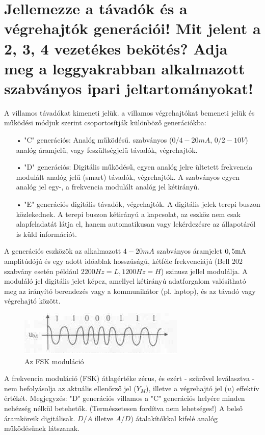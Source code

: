 \documentclass[11pt,a4paper]{article}
\begin{document}
\section{Jellemezze a távadók és a végrehajtók generációi! Mit jelent a 2, 3, 4 vezetékes bekötés? Adja meg a leggyakrabban alkalmazott szabványos ipari jeltartományokat!}
A villamos távadókat kimeneti jelük. a villamos végrehajtókat bemeneti jelük és működési módjuk szerint csoportosítják különböző generációkba:
\begin{enumerate}
	\item[•]"C" generációs: Analóg működésű. szabványos ($0/4-20mA$, $0/2-10V$) analóg áramjelű, vagy feszültségjelű távadók, végrehajtók.
	\item[•]"D" generációs: Digitális működésű, egyen analóg jelre ültetett frekvencia modulált analóg jelű (smart) távadók, végrehajtók. A szabványos egyen analóg jel egy-, a frekvencia modulált analóg jel kétirányú.
	\item[•]"E" generációs digitális távadók, végrehajtók. A digitális jelek terepi buszon közlekednek. A terepi buszon kétirányú a kapcsolat, az eszköz nem csak alapfeladatát látja el, hanem automatikusan vagy lekérdezésre az állapotáról is küld információt.
\end{enumerate}
A generációs eszközök az alkalmazott $4-20 mA$ szabványos áramjelet $\rm 0,5mA$ amplitúdójú és egy adott időablak hosszúságú, kétféle frekvenciájú (Bell 202 szabvány esetén például $2200 Hz = L, 1200 Hz = H$) szinusz jellel modulálja. A moduláló jel digitális jelet képez, amellyel kétirányú adatforgalom valósítható meg az irányító berendezés vagy a kommunikátor (pl. laptop), és az távadó vagy végrehajtó között.\\
\begin{figure}[hbtp]
    	 \centering
		\includegraphics[scale=1.0]{8_fsk.png}
		\caption{Az FSK moduláció}
\end{figure}
A frekvencia moduláció (FSK) átlagértéke zérus, és ezért - szűrővel leválasztva - nem befolyásolja az aktuális ellenőrző jel ($Y_M$), illetve a végrehajtó jel ($u$) effektív értékét.
Megjegyzés: "D" generációs villamos a "C" generációs   helyére minden nehézség nélkül betehetők. (Természetesen fordítva nem lehetséges!) A belső áramköreik digitálisak. $D/A$ illetve $A/D$) átalakítókkal kifelé analóg működésűnek látszanak.$$$$
\end{document}
